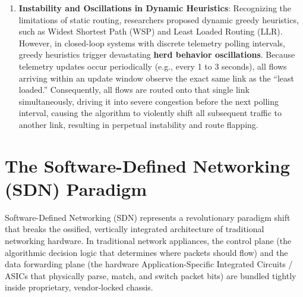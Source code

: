 \begin{enumerate}[label=\textbf{\arabic*.}]
\begin{itemize}
        \item \emph{Hash Polarization}: In multi-stage Clos architectures, identical hashing algorithms implemented across consecutive switch tiers often map the same subset of flows onto identical downstream paths, concentrating traffic onto a fraction of available fabric links.
    \end{itemize}
    \item \textbf{Instability and Oscillations in Dynamic Heuristics}: Recognizing the limitations of static routing, researchers proposed dynamic greedy heuristics, such as Widest Shortest Path (WSP) and Least Loaded Routing (LLR). However, in closed-loop systems with discrete telemetry polling intervals, greedy heuristics trigger devastating \textbf{herd behavior oscillations}. Because telemetry updates occur periodically (e.g., every 1 to 3 seconds), all flows arriving within an update window observe the exact same link as the ``least loaded.'' Consequently, all flows are routed onto that single link simultaneously, driving it into severe congestion before the next polling interval, causing the algorithm to violently shift all subsequent traffic to another link, resulting in perpetual instability and route flapping.
\end{enumerate}

\section{The Software-Defined Networking (SDN) Paradigm}
Software-Defined Networking (SDN) represents a revolutionary paradigm shift that breaks the ossified, vertically integrated architecture of traditional networking hardware. In traditional network appliances, the control plane (the algorithmic decision logic that determines where packets should flow) and the data forwarding plane (the hardware Application-Specific Integrated Circuits / ASICs that physically parse, match, and switch packet bits) are bundled tightly inside proprietary, vendor-locked chassis.

